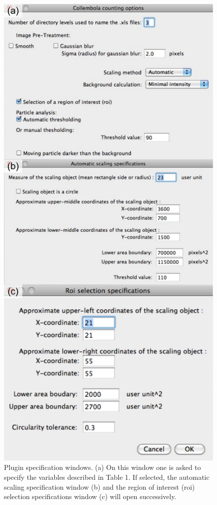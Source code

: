 \begin{figure}[!h] %
\centering
\includegraphics[height=0.85\textheight]{2_Methodo/Fig/FigS2.pdf}
\caption[  Plugin specification windows]{ Plugin specification windows. (a) On this window one is asked to specify the variables
described in Table 1. If selected, the automatic scaling specification window
(b) and the region of interest (roi) selection specifications window (c) will
open successively.
}
\label{Fig21-S2}
\end{figure}

